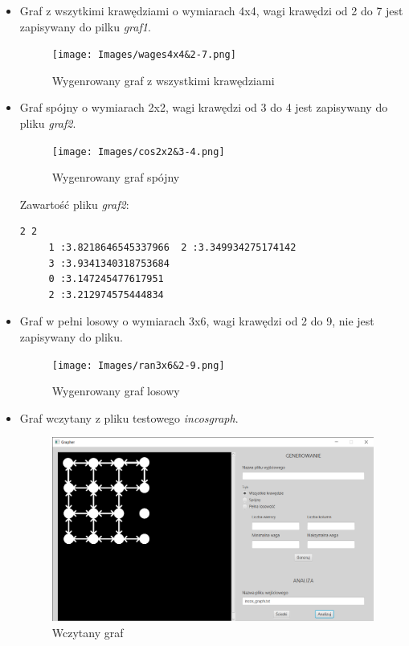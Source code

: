\documentclass{article}
\begin{document}
\begin{itemize}
    \item Graf z wszytkimi krawędziami o wymiarach 4x4, wagi krawędzi od 2 do 7 jest zapisywany do pilku \emph{graf1}.
    \begin{figure}[htp]
        \centering
        \texttt{[image: Images/wages4x4\&2-7.png]}
        \caption{Wygenrowany graf z wszystkimi krawędziami}
        \label{fig:g1}
    \end{figure}
    
    \newpage
    
    \item Graf spójny o wymiarach 2x2, wagi krawędzi od 3 do 4 jest zapisywany do pliku \emph{graf2}.

    \begin{figure}[ht]
        \centering
        \texttt{[image: Images/cos2x2\&3-4.png]}
        \caption{Wygenrowany graf spójny}
        \label{fig:g2}
    \end{figure}
    
    Zawartość pliku \emph{graf2}:
    \begin{lstlisting}
2 2
	 1 :3.8218646545337966  2 :3.349934275174142  
	 3 :3.9341340318753684  
	 0 :3.147245477617951  
	 2 :3.212974575444834 
    \end{lstlisting}
    
    \newpage
    
    \item Graf w pełni losowy o wymiarach 3x6, wagi krawędzi od 2 do 9, nie jest zapisywany do pliku.
    
     \begin{figure}[ht]
        \centering
        \texttt{[image: Images/ran3x6\&2-9.png]}
        \caption{Wygenrowany graf losowy}
        \label{fig:g3}
    \end{figure}
    
    \newpage
    
    \item Graf wczytany z pliku testowego \emph{incos\textunderscore graph}.
    
    \begin{figure}[ht]
        \centering
        \includegraphics[width=11cm]{Images/analize.png}
        \caption{Wczytany graf}
        \label{fig:g4}
    \end{figure}
    

\end{itemize}
\end{document}
